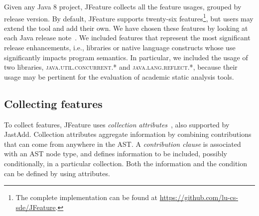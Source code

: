 Given any Java 8 project, JFeature collects all the feature usages, grouped by release version. By default, JFeature supports twenty-six features\footnote{The complete implementation can be found at \url{https://github.com/lu-cs-sde/JFeature}.}, but users may extend the tool and add their own. We have chosen these features by looking at each Java release note~\cite{java1,java2,java3,java4,java5,java6,java7,java8}. We included features that represent the most significant release enhancements, i.e., libraries or native language constructs whose use significantly impacts program semantics. In particular, we included the usage of two libraries, \textsc{java.util.concurrent.*} and \textsc{java.lang.reflect.*}, because their usage may be pertinent for the evaluation of academic static analysis tools.


\subsection{Collecting features}
To collect features, JFeature uses \emph{collection attributes}~\cite{boyland1996descriptional,collectionattributes}, also supported by JastAdd.
Collection attributes aggregate information by combining contributions that can come from anywhere in the AST.
A \emph{contribution clause} is associated with an AST node type, and defines information to be included, possibly conditionally, in a particular collection.
Both the information and the condition can be defined by using attributes.

